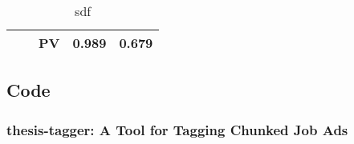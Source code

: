 \begin{table}[h]
\begin{center}
\begin{tabular}{ lll cc }
      & & PV & 0.989 & 0.679 \\
      \bottomrule
    \end{tabular}
  \caption{sdf}
\label{tab:Paragraph Vector Parameter Hyper-Parameter Results}
\end{center}
\end{table}

% 
% 




\clearpage

\subsection{Code}

\subsubsection*{thesis-tagger: A Tool for Tagging Chunked Job Ads}
\label{sub:thesis-tagger: A Tool for Tagging Chunked Job Ads}

